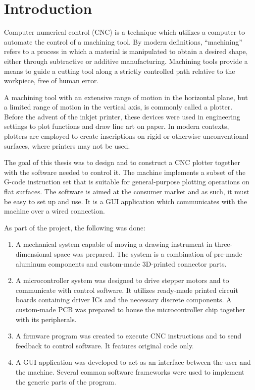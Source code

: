 \clearpage
\section{Introduction}

Computer numerical control (CNC) is a technique which utilizes a computer to
automate the control of a machining tool. By modern definitions, ``machining''
refers to a process in which a material is manipulated to obtain a desired
shape, either through subtractive or additive manufacturing. Machining tools
provide a means to guide a cutting tool along a strictly controlled path
relative to the workpiece, free of human error.

A machining tool with an extensive range of motion in the horizontal plane, but
a limited range of motion in the vertical axis, is commonly called a plotter.
Before the advent of the inkjet printer, these devices were used in engineering
settings to plot functions and draw line art on paper. In modern contexts,
plotters are employed to create inscriptions on rigid or otherwise
unconventional surfaces, where printers may not be used.

The goal of this thesis was to design and to construct a CNC plotter together
with the software needed to control it. The machine implements a subset of the
G-code instruction set that is suitable for general-purpose plotting operations
on flat surfaces. The software is aimed at the consumer market and as such, it
must be easy to set up and use. It is a GUI application which communicates with
the machine over a wired connection.

As part of the project, the following was done:
\begin{enumerate}
    \item A mechanical system capable of moving a drawing instrument in
    three-dimensional space was prepared. The system is a combination of
    pre-made aluminum components and custom-made 3D-printed connector parts.
    \item A microcontroller system was designed to drive stepper motors and to
    communicate with control software. It utilizes ready-made printed circuit
    boards containing driver ICs and the necessary discrete components. A
    custom-made PCB was prepared to house the microcontroller chip together
    with its peripherals.
    \item A firmware program was created to execute CNC instructions and to send
    feedback to control software. It features original code only.
    \item A GUI application was developed to act as an interface between the
    user and the machine. Several common software frameworks were used to
    implement the generic parts of the program.
\end{enumerate}

